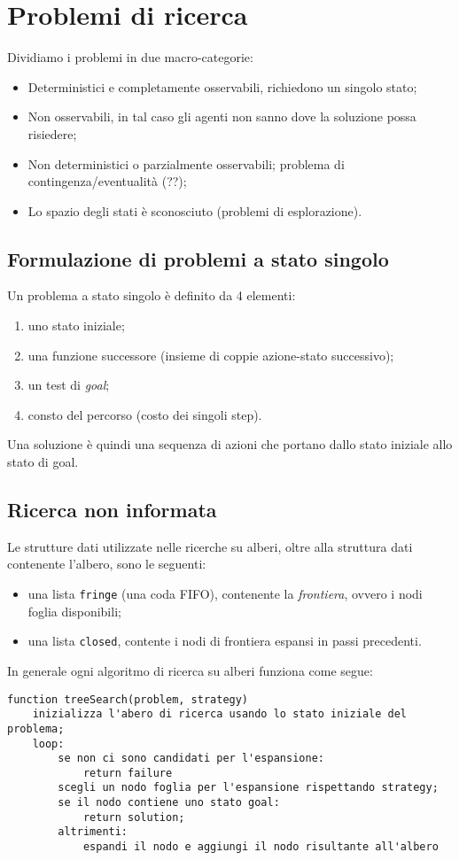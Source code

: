 \documentclass[a4paper, 11pt]{article}
\begin{document}
\newpage
\section{Problemi di ricerca}
Dividiamo i problemi in due macro-categorie:
\begin{itemize}
	\item Deterministici e completamente osservabili, richiedono un singolo stato;
	\item Non osservabili, in tal caso gli agenti non sanno dove la soluzione possa risiedere;
	\item Non deterministici o parzialmente osservabili; problema di contingenza/eventualità (??);
	\item Lo spazio degli stati è sconosciuto (problemi di esplorazione).
\end{itemize}

\subsection{Formulazione di problemi a stato singolo}
Un problema a stato singolo è definito da 4 elementi: \begin{enumerate}
	\item uno stato iniziale;
	\item una funzione successore (insieme di coppie azione-stato successivo);
	\item un test di \textit{goal};
	\item consto del percorso (costo dei singoli step).
\end{enumerate}

Una soluzione è quindi una sequenza di azioni che portano dallo stato iniziale allo stato di goal.




\subsection{Ricerca non informata}
Le strutture dati utilizzate nelle ricerche su alberi, oltre alla struttura dati contenente l'albero, sono le seguenti:
\begin{itemize}
	\item una lista \lstinline|fringe| (una coda FIFO), contenente la \textit{frontiera}, ovvero i nodi foglia disponibili;
	\item una lista \lstinline|closed|, contente i nodi di frontiera espansi in passi precedenti.
\end{itemize}
In generale ogni algoritmo di ricerca su alberi funziona come segue:
\begin{lstlisting}[frame=tb]
function treeSearch(problem, strategy)
	inizializza l'abero di ricerca usando lo stato iniziale del problema;
	loop:
		se non ci sono candidati per l'espansione:
			return failure
		scegli un nodo foglia per l'espansione rispettando strategy;
		se il nodo contiene uno stato goal:
			return solution;
		altrimenti:
			espandi il nodo e aggiungi il nodo risultante all'albero
\end{lstlisting}
\end{document}
